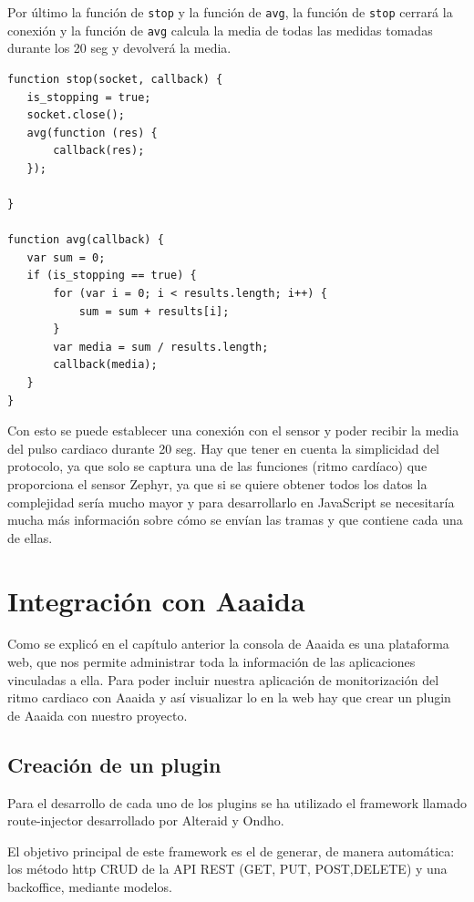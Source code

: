 Por último la función de \texttt{stop} y la función de \texttt{avg}, la función de \texttt{stop} cerrará la conexión y la función de \texttt{avg} calcula la media de todas las medidas tomadas durante los 20 seg y devolverá la media. 

\begin{verbatim}
function stop(socket, callback) {
   is_stopping = true;
   socket.close();
   avg(function (res) {
       callback(res);
   });

}

function avg(callback) {
   var sum = 0;
   if (is_stopping == true) {
       for (var i = 0; i < results.length; i++) {
           sum = sum + results[i];
       }
       var media = sum / results.length;
       callback(media);
   }
}
\end{verbatim}

Con esto se puede establecer una conexión con el sensor y poder recibir la media del pulso cardiaco durante 20 seg. Hay que tener en cuenta la simplicidad del protocolo, ya que solo se captura una de las funciones (ritmo cardíaco) que proporciona el sensor Zephyr, ya que si se quiere obtener todos los datos la complejidad sería mucho mayor y para desarrollarlo en JavaScript se necesitaría mucha más información sobre cómo se envían las tramas y que contiene cada una de ellas.
\pagebreak
\section{Integración con Aaaida}

Como se explicó en el capítulo anterior la consola de Aaaida es una plataforma web, que nos permite administrar toda la información de las aplicaciones vinculadas a ella. 
Para poder incluir nuestra aplicación de monitorización del ritmo cardiaco con Aaaida y así visualizar lo en la web hay que crear un plugin de Aaaida con nuestro proyecto. 

\subsection{Creación de un plugin}

Para el desarrollo de cada uno de los plugins se ha utilizado el framework llamado route-injector desarrollado por Alteraid y Ondho. 

El objetivo principal de este framework es el de generar, de manera automática:
los método http CRUD de la API REST (GET, PUT, POST,DELETE) y una
backoffice, mediante modelos.

